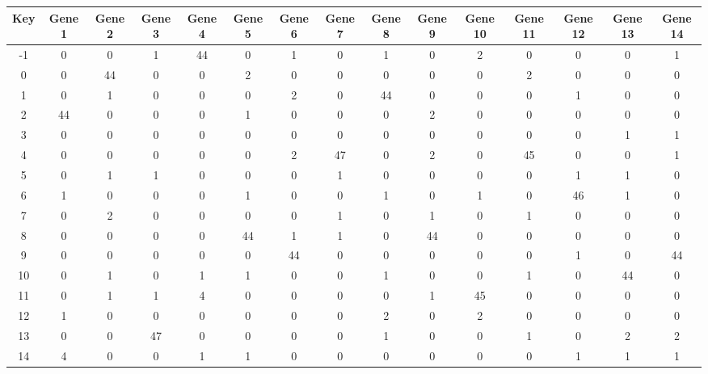 \begin{tabular}{|c|c|c|c|c|c|c|c|c|c|c|c|c|c|c|}
\hline
Key & Gene 1 & Gene 2 & Gene 3 & Gene 4 & Gene 5 & Gene 6 & Gene 7 & Gene 8 & Gene 9 & Gene 10 & Gene 11 & Gene 12 & Gene 13 & Gene 14 \\
\hline
-1 & 0 & 0 & 1 & 44 & 0 & 1 & 0 & 1 & 0 & 2 & 0 & 0 & 0 & 1 \\
0 & 0 & 44 & 0 & 0 & 2 & 0 & 0 & 0 & 0 & 0 & 2 & 0 & 0 & 0 \\
1 & 0 & 1 & 0 & 0 & 0 & 2 & 0 & 44 & 0 & 0 & 0 & 1 & 0 & 0 \\
2 & 44 & 0 & 0 & 0 & 1 & 0 & 0 & 0 & 2 & 0 & 0 & 0 & 0 & 0 \\
3 & 0 & 0 & 0 & 0 & 0 & 0 & 0 & 0 & 0 & 0 & 0 & 0 & 1 & 1 \\
4 & 0 & 0 & 0 & 0 & 0 & 2 & 47 & 0 & 2 & 0 & 45 & 0 & 0 & 1 \\
5 & 0 & 1 & 1 & 0 & 0 & 0 & 1 & 0 & 0 & 0 & 0 & 1 & 1 & 0 \\
6 & 1 & 0 & 0 & 0 & 1 & 0 & 0 & 1 & 0 & 1 & 0 & 46 & 1 & 0 \\
7 & 0 & 2 & 0 & 0 & 0 & 0 & 1 & 0 & 1 & 0 & 1 & 0 & 0 & 0 \\
8 & 0 & 0 & 0 & 0 & 44 & 1 & 1 & 0 & 44 & 0 & 0 & 0 & 0 & 0 \\
9 & 0 & 0 & 0 & 0 & 0 & 44 & 0 & 0 & 0 & 0 & 0 & 1 & 0 & 44 \\
10 & 0 & 1 & 0 & 1 & 1 & 0 & 0 & 1 & 0 & 0 & 1 & 0 & 44 & 0 \\
11 & 0 & 1 & 1 & 4 & 0 & 0 & 0 & 0 & 1 & 45 & 0 & 0 & 0 & 0 \\
12 & 1 & 0 & 0 & 0 & 0 & 0 & 0 & 2 & 0 & 2 & 0 & 0 & 0 & 0 \\
13 & 0 & 0 & 47 & 0 & 0 & 0 & 0 & 1 & 0 & 0 & 1 & 0 & 2 & 2 \\
14 & 4 & 0 & 0 & 1 & 1 & 0 & 0 & 0 & 0 & 0 & 0 & 1 & 1 & 1 \\
\hline
\end{tabular}
